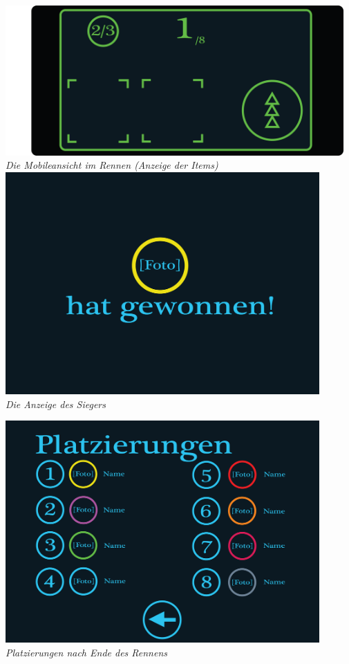 \begin{flushright}
\newpage

\includegraphics[width=0.97\textwidth]{img/handyansicht.png}\\
\textit{Die Mobileansicht im Rennen (Anzeige der Items)}\\[4em]

\includegraphics[width=0.9\textwidth]{img/win.png}\\
\textit{Die Anzeige des Siegers}

\newpage

\includegraphics[width=0.9\textwidth]{img/platzierungen.png}\\
\textit{Platzierungen nach Ende des Rennens}

\end{flushright}
